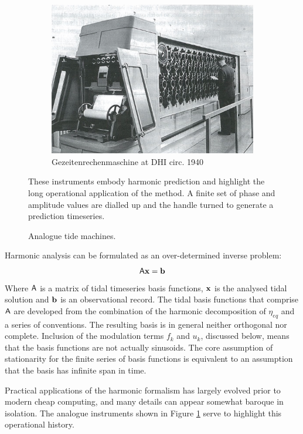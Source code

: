 \begin{figure}[!hbt]
\begin{subfigure}[t]{\figwidthHalf}
    	\includegraphics[width=\textwidth]{figures/images/DHI_machine_cartwright_fig11p2.png}
	    \caption{Gezeitenrechenmaschine at DHI circ. 1940 }
	\end{subfigure}
	\caption{Analogue tide machines.}{These instruments embody harmonic prediction and highlight the long operational application of the method.  A finite set of phase and amplitude values are dialled up and the handle turned to generate a prediction timeseries.}
	\label{fig:tide_machines}
\end{figure}
Harmonic analysis can be formulated as an over-determined inverse problem:
\begin{equation}
    \label{E:Axb}   
    \mathsf{A} \mathbf{x}=\mathbf{b} 
\end{equation}
Where $\mathsf{A}$ is a matrix of tidal timeseries basis functions, $\mathbf{x}$ is the analysed tidal solution and $\mathbf{b}$ is an observational record. The tidal basis functions that comprise $\mathsf{A}$ are developed from the combination of the harmonic decomposition of $\eta_{eq}$ and a series of conventions.  
The resulting basis is in general neither orthogonal nor complete. Inclusion of the modulation terms $f_k$ and $u_k$, discussed below, means that the basis functions are not actually sinusoids. The core assumption of stationarity for the finite series of basis functions is equivalent to an assumption that the basis has infinite span in time.   

Practical applications of the harmonic formalism has largely evolved prior to modern cheap computing, and many details can appear somewhat baroque in isolation.  The analogue instruments shown in Figure \ref{fig:tide_machines} serve to highlight this operational history.


